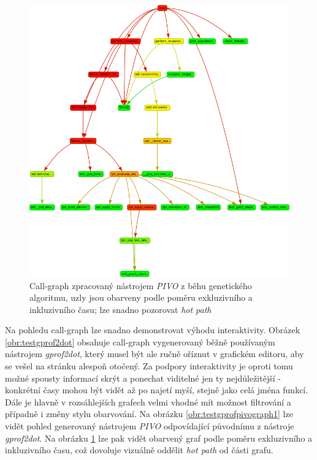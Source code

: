 \documentclass[czech,BP]{thesiskiv}
\begin{document}
\begin{figure}[h]
    \centering
    \includegraphics[interpolate,width=1.0\textwidth]{img/test-ga-pivo-graph-ratio.png}
    \caption{Call-graph zpracovaný nástrojem \emph{PIVO} z běhu genetického algoritmu, uzly jsou obarveny podle poměru exkluzivního a inkluzivního času; lze snadno pozorovat \emph{hot path}}
    \label{obr:testgprofpivograph2}
\end{figure}

\newpage

Na pohledu call-graph lze snadno demonstrovat výhodu interaktivity. Obrázek \ref{obr:testgprof2dot} obsahuje call-graph vygenerovaný běžně používaným nástrojem \emph{gprof2dot}, který musel být ale ručně oříznut v grafickém editoru, aby se vešel na stránku alespoň otočený. Za podpory interaktivity je oproti tomu možné spousty informací skrýt a ponechat viditelné jen ty nejdůležitější - konkrétní časy mohou být vidět až po najetí myší, stejně jako celá jména funkcí. Dále je hlavně v rozsáhlejších grafech velmi vhodné mít možnost filtrování a případně i změny stylu obarvování. Na obrázku \ref{obr:testgprofpivograph1} lze vidět pohled generovaný nástrojem \emph{PIVO} odpovídající původnímu z nástroje \emph{gprof2dot}. Na obrázku \ref{obr:testgprofpivograph2} lze pak vidět obarvený graf podle poměru exkluzivního a inkluzivního času, což dovoluje vizuálně oddělit \emph{hot path} od  části grafu.
\end{document}
